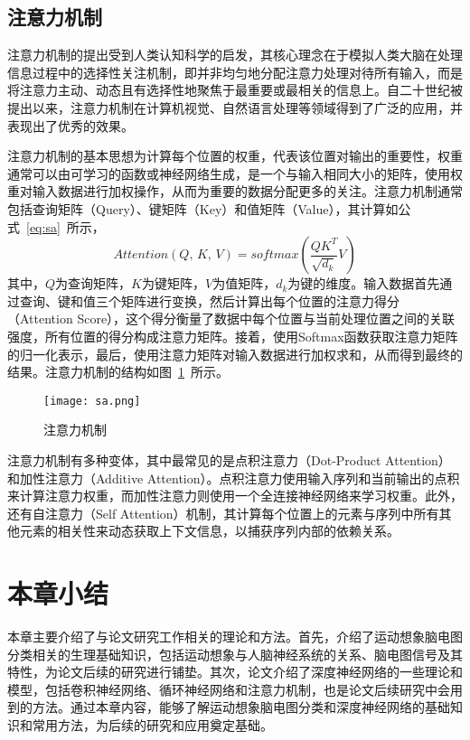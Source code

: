 \subsection{注意力机制}

注意力机制的提出受到人类认知科学的启发，其核心理念在于模拟人类大脑在处理信息过程中的选择性关注机制，即并非均匀地分配注意力处理对待所有输入，而是将注意力主动、动态且有选择性地聚焦于最重要或最相关的信息上。自二十世纪被提出以来\cite{730558}，注意力机制在计算机视觉、自然语言处理等领域得到了广泛的应用，并表现出了优秀的效果。

注意力机制的基本思想为计算每个位置的权重，代表该位置对输出的重要性，权重通常可以由可学习的函数或神经网络生成，是一个与输入相同大小的矩阵，使用权重对输入数据进行加权操作，从而为重要的数据分配更多的关注。注意力机制通常包括查询矩阵（Query）、键矩阵（Key）和值矩阵（Value），其计算如公式~\ref{eq:sa}~所示，
\begin{equation}\label{eq:sa}
    Attention(Q,\,K,\,V)=softmax(\frac{QK^{T}}{\sqrt{d_k}}V)
\end{equation}
其中，\(Q\)为查询矩阵，\(K\)为键矩阵，\(V\)为值矩阵，\(d_k\)为键的维度。输入数据首先通过查询、键和值三个矩阵进行变换，然后计算出每个位置的注意力得分（Attention Score），这个得分衡量了数据中每个位置与当前处理位置之间的关联强度，所有位置的得分构成注意力矩阵。接着，使用Softmax函数获取注意力矩阵的归一化表示，最后，使用注意力矩阵对输入数据进行加权求和，从而得到最终的结果。注意力机制的结构如图~\ref{fig:sa}~所示。
\begin{figure}
    \centering
    \texttt{[image: sa.png]}
    \caption{注意力机制}
    \label{fig:sa}
\end{figure}

注意力机制有多种变体，其中最常见的是点积注意力（Dot-Product Attention）和加性注意力（Additive Attention）。点积注意力使用输入序列和当前输出的点积来计算注意力权重，而加性注意力则使用一个全连接神经网络来学习权重。此外，还有自注意力（Self Attention）\cite{vaswani2017attention}机制，其计算每个位置上的元素与序列中所有其他元素的相关性来动态获取上下文信息，以捕获序列内部的依赖关系。

\section{本章小结}

本章主要介绍了与论文研究工作相关的理论和方法。首先，介绍了运动想象脑电图分类相关的生理基础知识，包括运动想象与人脑神经系统的关系、脑电图信号及其特性，为论文后续的研究进行铺垫。其次，论文介绍了深度神经网络的一些理论和模型，包括卷积神经网络、循环神经网络和注意力机制，也是论文后续研究中会用到的方法。通过本章内容，能够了解运动想象脑电图分类和深度神经网络的基础知识和常用方法，为后续的研究和应用奠定基础。